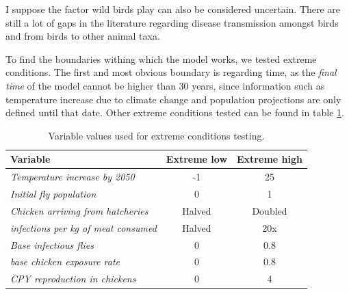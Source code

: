 I suppose the factor wild birds play can also be considered uncertain. There are still a lot of gaps in the literature regarding disease transmission amongst birds and from birds to other animal taxa.
\fi

To find the boundaries withing which the model works, we tested extreme conditions. The first and most obvious boundary is regarding time, as the \textit{final time} of the model cannot be higher than 30 years, since information such as temperature increase due to climate change and population projections are only defined until that date. Other extreme conditions tested can be found in table \ref{tab:extreme_values}.

\begin{table}[]
\centering
\begin{tabular}{|l|c|c|}
\hline
\textbf{Variable}                             & \textbf{Extreme low} & \textbf{Extreme high} \\ \hline
\textit{Temperature   increase by 2050}       & -1                   & 25                    \\ \hline
\textit{Initial fly population}               & 0                    & 1                     \\ \hline
\textit{Chicken arriving from   hatcheries}   & Halved               & Doubled               \\ \hline
\textit{infections per kg of meat   consumed} & Halved               & 20x                   \\ \hline
\textit{Base infectious flies}                & 0                    & 0.8                   \\ \hline
\textit{base chicken exposure rate}           & 0                    & 0.8                   \\ \hline
\textit{CPY reproduction in chickens}         & 0                    & 4                     \\ \hline
\end{tabular}
\caption{Variable values used for extreme conditions testing.}
\label{tab:extreme_values}
\end{table}

